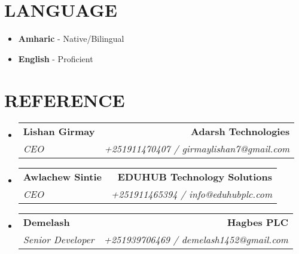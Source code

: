 \documentclass[letterpaper,11pt]{article}
\makeatletter
\newcommand{\resumeSubheading}[4]{
  \vspace{3pt}\item
    \begin{tabular*}{1.0\textwidth}[t]{l@{\extracolsep{\fill}}r}
      \textbf{\large#1} &  \textbf{\small #2} \\
      \textit{\large#3} & \textit{\small #4} \\
      
    \end{tabular*}\vspace{-1pt}
}
\newcommand{\resumeSubHeadingListStart}{\begin{itemize}[leftmargin=0.0in, label={}]}
\newcommand{\resumeSubHeadingListEnd}{\end{itemize}}
\makeatother
\begin{document}
  
\vspace{10pt}  
\section{LANGUAGE}
\vspace{10pt}
\begin{itemize}
	\item \textbf{Amharic} - Native/Bilingual
	\item \textbf{English} - Proficient
\end{itemize}

\vspace{10pt}
\section{REFERENCE}
  \resumeSubHeadingListStart
    \resumeSubheading
      {Lishan Girmay} {Adarsh Technologies}
            {CEO }{+251911470407 / girmaylishan7@gmail.com}
  \resumeSubHeadingListEnd 
  \resumeSubHeadingListStart
    \resumeSubheading
      {Awlachew Sintie} {EDUHUB Technology Solutions}
      {CEO }{+251911465394 / info@eduhubplc.com}
  \resumeSubHeadingListEnd 
  \resumeSubHeadingListStart
    \resumeSubheading
      {Demelash} {Hagbes PLC}
      {Senior Developer}{+251939706469 / demelash1452@gmail.com}
  \resumeSubHeadingListEnd 
  
\end{document}
